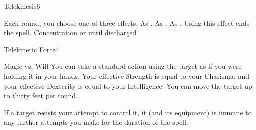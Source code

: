 \begin{spellsection}{Telekinesis}{6}
\begin{spellheader}
    \spellrng{\rngmed}
\end{spellheader}
\begin{spellcontent}
    \spellspecial Each round, you choose one of three effects.
     As .
     As .
     As . Using this effect ends the spell.
    \spelldur Concentration or until discharged
\end{spellcontent}
\begin{spellfooter}
\end{spellfooter}
\end{spellsection}

\begin{spellsection}{Telekinetic Force}{4}
\begin{spellheader}
\end{spellheader}
\begin{spellcontent}
    \begin{spelltargetinginfo}
    \end{spelltargetinginfo}
    \begin{spelleffects}
        \begin{spellattack}{Magic vs. Will}
            \spellsuccess You can take a standard action using the target as if you were holding it in your hands. Your effective Strength is equal to your Charisma, and your effective Dexterity is equal to your Intelligence. You can move the target up to thirty feet per round.
        \end{spellattack}
    \end{spelleffects}
\end{spellcontent}
\begin{spellfooter}
    \spellnotes If a target resists your attempt to control it, it (and its equipment) is immune to any further attempts you make for the duration of the spell.
\end{spellfooter}
\end{spellsection}

